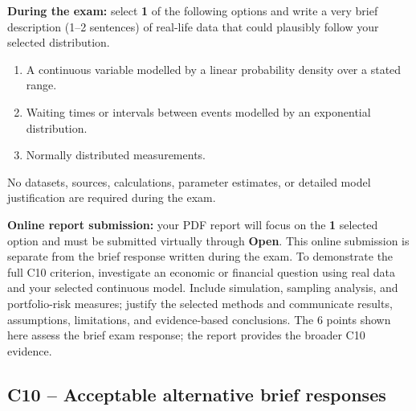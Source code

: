 {
\textbf{During the exam:} select \textbf{1} of the following options and write a very brief description (1--2 sentences) of real-life data that could plausibly follow your selected distribution. 
\begin{enumerate}[label=\textbf{(\alph*)},leftmargin=*]
\item A continuous variable modelled by a linear probability density over a stated range.
\item Waiting times or intervals between events modelled by an exponential distribution.
\item Normally distributed measurements.
\end{enumerate}
No datasets, sources, calculations, parameter estimates, or detailed model justification are required during the exam.

\textbf{Online report submission:} your PDF report will focus on the \textbf{1} selected option and must be submitted virtually through \textbf{Open}. This online submission is separate from the brief response written during the exam. To demonstrate the full C10 criterion, investigate an economic or financial question using real data and your selected continuous model. Include simulation, sampling analysis, and portfolio-risk measures; justify the selected methods and communicate results, assumptions, limitations, and evidence-based conclusions. The 6 points shown here assess the brief exam response; the report provides the broader C10 evidence.

\label{sol:q17a}
\subsection*{C10 -- Acceptable alternative brief responses }

}
